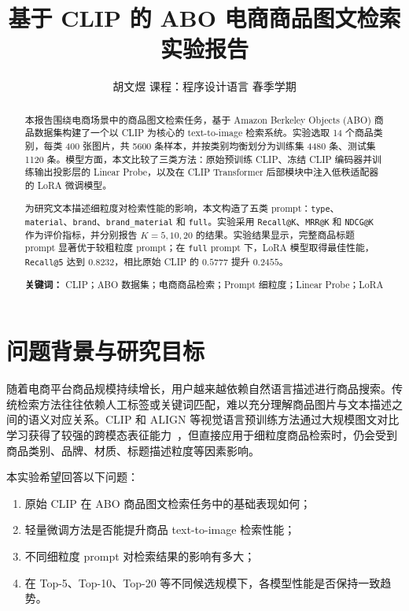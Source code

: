 \documentclass[11pt, a4paper]{ctexart}
\title{\vspace{-1.5cm}\textbf{基于 CLIP 的 ABO 电商商品图文检索实验报告}}
\author{胡文煜 \quad 课程：程序设计语言 \quad 2026 春季学期 \quad }
\date{}
\begin{document}
\maketitle
\thispagestyle{fancy}

\begin{abstract}
\noindent
本报告围绕电商场景中的商品图文检索任务，基于 Amazon Berkeley Objects (ABO) 商品数据集构建了一个以 CLIP 为核心的 text-to-image 检索系统。实验选取 14 个商品类别，每类 400 张图片，共 5600 条样本，并按类别均衡划分为训练集 4480 条、测试集 1120 条。模型方面，本文比较了三类方法：原始预训练 CLIP、冻结 CLIP 编码器并训练输出投影层的 Linear Probe，以及在 CLIP Transformer 后部模块中注入低秩适配器的 LoRA 微调模型。

\medskip\noindent
为研究文本描述细粒度对检索性能的影响，本文构造了五类 prompt：\texttt{type}、\texttt{material}、\texttt{brand}、\texttt{brand\_material} 和 \texttt{full}。实验采用 \texttt{Recall@K}、\texttt{MRR@K} 和 \texttt{NDCG@K} 作为评价指标，并分别报告 $K=5,10,20$ 的结果。实验结果显示，完整商品标题 prompt 显著优于较粗粒度 prompt；在 \texttt{full} prompt 下，LoRA 模型取得最佳性能，\texttt{Recall@5} 达到 $0.8232$，相比原始 CLIP 的 $0.5777$ 提升 $0.2455$。

\medskip\noindent
\textbf{关键词：} CLIP；ABO 数据集；电商商品检索；Prompt 细粒度；Linear Probe；LoRA
\end{abstract}

\section{问题背景与研究目标}

随着电商平台商品规模持续增长，用户越来越依赖自然语言描述进行商品搜索。传统检索方法往往依赖人工标签或关键词匹配，难以充分理解商品图片与文本描述之间的语义对应关系。CLIP 和 ALIGN 等视觉语言预训练方法通过大规模图文对比学习获得了较强的跨模态表征能力~\cite{radford2021clip,jia2021align}，但直接应用于细粒度商品检索时，仍会受到商品类别、品牌、材质、标题描述粒度等因素影响。

本实验希望回答以下问题：
\begin{enumerate}[leftmargin=2em, itemsep=0pt]
    \item 原始 CLIP 在 ABO 商品图文检索任务中的基础表现如何；
    \item 轻量微调方法是否能提升商品 text-to-image 检索性能；
    \item 不同细粒度 prompt 对检索结果的影响有多大；
    \item 在 Top-5、Top-10、Top-20 等不同候选规模下，各模型性能是否保持一致趋势。
\end{enumerate}
\end{document}
